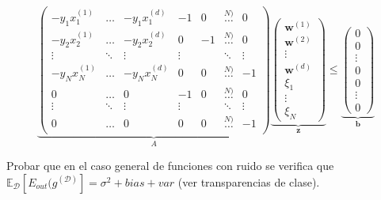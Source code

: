 \documentclass[11pt,leqno]{article}
\theoremstyle{definition}
\begin{document}
\begin{solucion}
\begin{enumerate}[a]
\[ 
\underbrace{
\left(\begin{array}{ccccccc}
-y_1 x_1^{(1)} 	& \dots & -y_1 x_1^{(d)} & -1 & 0 	& \overset{N)}{\dots} 	& 0 \\
-y_2 x_2^{(1)} 	& \dots & -y_2 x_2^{(d)} &  0 & -1 	& \overset{N)}{\dots} 	& 0 \\
\vdots 			& \ddots & \vdots 		 &  \vdots&	 	& \ddots			& \vdots \\
-y_N x_N^{(1)} 	& \dots & -y_N x_N^{(d)} & 0 & 0 	& \overset{N)}{\dots} 	& -1 \\
0			 	& \dots & 0				 & -1 & 0 	& \overset{N)}{\dots} 	& 0 \\
\vdots 			& \ddots & \vdots 		 &  \vdots&	 	& \ddots			& \vdots \\
0				& \dots & 0				 & 0  & 0 	& \overset{N)}{\dots} 	& -1 \\
\end{array}\right)}_A
\underbrace{
\left(
\begin{array}{c}
\mathbf{w}^{(1)} \\ \mathbf{w}^{(2)} \\ \vdots \\ \mathbf{w}^{(d)} \\ 
\xi_1 \\ \vdots \\ \xi_N 
\end{array}
\right)}_\mathbf{z}
\leq
\underbrace{
\left(
\begin{array}{c}
0 \\ 0 \\ \vdots \\ 0 \\  0 \\ \vdots \\ 0
\end{array}
\right)}_\mathbf{b}
\]

\end{enumerate}
\end{solucion}

\begin{cuestion}
Probar que en el caso general de funciones con ruido se verifica que $\mathbb{E}_\mathcal{D}[E_{out}(g^{(\mathcal{D})}] = \sigma^2 + bias + var$ (ver transparencias de clase).
\end{cuestion}
\end{document}
